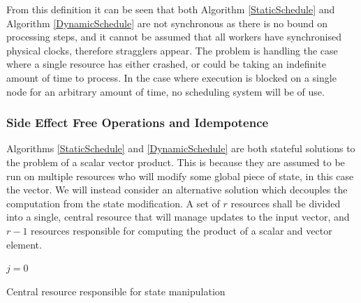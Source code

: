 \documentclass[12pt]{article}
\begin{document}
From this definition it can be seen that both Algorithm \ref{StaticSchedule} and Algorithm \ref{DynamicSchedule} are not synchronous as there is no bound on processing steps, and it cannot be assumed that all workers have synchronised physical clocks, therefore stragglers appear. The problem is handling the case where a single resource has either crashed, or could be taking an indefinite amount of time to process. In the case where execution is blocked on a single node for an arbitrary amount of time, no scheduling system will be of use.

\subsubsection{Side Effect Free Operations and Idempotence}
Algorithms \ref{StaticSchedule} and \ref{DynamicSchedule} are both stateful solutions to the problem of a scalar vector product. This is because they are assumed to be run on multiple resources who will modify some global piece of state, in this case the vector.
\newline
We will instead consider an alternative solution which decouples the computation from the state modification. A set of $r$ resources shall be divided into a single, central resource that will manage updates to the input vector, and $r-1$ resources responsible for computing the product of a scalar and vector element.

\IncMargin{1em}
\begin{algorithm}[H]
 \BlankLine
 
 $j = 0$\;
 \caption{Central resource responsible for state manipulation}
 \label{StatelessProduct}
\end{algorithm}
\DecMargin{1em}
\medskip
\end{document}
